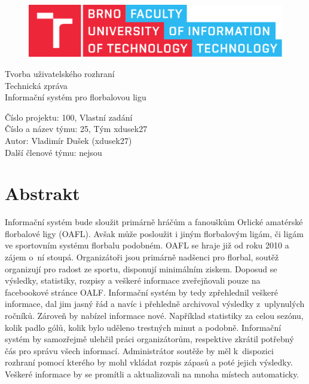 \documentclass[11pt, a4paper, titlepage]{article}
\begin{document}
\begin{titlepage}
    \begin{center}
        \begin{figure}[htb]
            \centering
            \includegraphics[width=0.85\hsize]{images/fitlogo.pdf}
        \end{figure}


        {\LARGE Tvorba uživatelského rozhraní} \\
        \bigskip
        \smallskip
        {\Huge Technická zpráva} \\
        \bigskip
        \smallskip
        {\LARGE Informační systém pro florbalovou ligu}

    \end{center}
    Číslo projektu: 100, Vlastní zadání \\
    Číslo a název týmu: 25, Tým xdusek27 \\
    Autor: Vladimír Dušek (xdusek27) \\
    Další členové týmu: nejsou \\
\end{titlepage}


\tableofcontents

\newpage


\section{Abstrakt}

Informační systém bude sloužit primárně hráčům a fanouškům Orlické amatérské florbalové ligy (OAFL). Avšak může posloužit i jiným florbalovým ligám, či ligám ve sportovním systému florbalu podobném. OAFL se hraje již od roku 2010 a zájem o~ní stoupá. Organizátoři jsou primárně nadšenci pro florbal, soutěž organizují pro radost ze sportu, disponují minimálním ziskem. Doposud se výsledky, statistiky, rozpisy a veškeré informace zveřejňovali pouze na facebookové stránce OALF. Informační systém by tedy zpřehlednil veškeré informace, dal jim jasný řád a navíc i přehledně archivoval výsledky z~uplynulých ročníků. Zároveň by nabízel informace nové. Například statistiky za celou sezónu, kolik padlo gólů, kolik bylo uděleno trestných minut a podobně. Informační systém by samozřejmě ulehčil práci organizátorům, respektive zkrátil potřebný čás pro správu všech informací. Administrátor soutěže by měl k~dispozici rozhraní pomocí kterého by mohl vkládat rozpis zápasů a poté jejich výsledky. Veškeré informace by se promítli a aktualizovali na mnoha místech automaticky.
\end{document}
